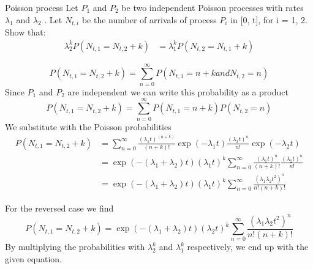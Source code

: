 \begin{problem}{Poisson process}
Let $P_1$ and $P_2$ be two independent Poisson processes with rates
$\lambda_1$ and $\lambda_2$ . Let $N_{t,i}$ be the number of arrivals of process $P_i$ in [0, t], for i = 1, 2. Show that:
\begin{align*}
    \lambda_2^k P(N_{t,1} = N_{t,2} + k)
    &=\lambda_1^k P(N _{t,2} = N_{t,1} + k)
\end{align*}
\end{problem}

\begin{solution}
  \[
    P(N_{t,1}=N_{t,2}+k) = \sum_{n=0}^\infty P(N_{t,1}=n+k and N_{t,2}=n)
  \]
  Since $P_1$ and $P_2$ are independent we can write this probability as a product
  \[
    P(N_{t,1}=N_{t,2}+k) = \sum_{n=0}^\infty P(N_{t,1}=n+k)P(N_{t,2}=n)
  \]
  We substitute with the Poisson probabilities
  \begin{align*}
    P(N_{t,1}=N_{t,2}+k) &= \sum_{n=0}^\infty \frac{(\lambda_1t)^{(n+k)}}{(n+k)!}\exp(-\lambda_1t)\frac{(\lambda_2t)^n}{n!}\exp(-\lambda_2t) \\
    &= \exp(-(\lambda_1+\lambda_2)t)(\lambda_1t)^k\sum_{n=0}^\infty \frac{(\lambda_1t)^n}{(n+k)!}\frac{(\lambda_2t)^n}{n!} \\
    &= \exp(-(\lambda_1+\lambda_2)t)(\lambda_1t)^k\sum_{n=0}^\infty \frac{(\lambda_1\lambda_2t^2)^n}{n!(n+k)!}
  \end{align*}

  For the reversed case we find
  \[
    P(N_{t,1}=N_{t,2}+k)= \exp(-(\lambda_1+\lambda_2)t)(\lambda_2t)^k\sum_{n=0}^\infty \frac{(\lambda_1\lambda_2t^2)^n}{n!(n+k)!}
  \]
  By multiplying the probabilities with $\lambda_2^k$ and $\lambda_1^k$ respectively, we end up with the given equation.
\end{solution}

